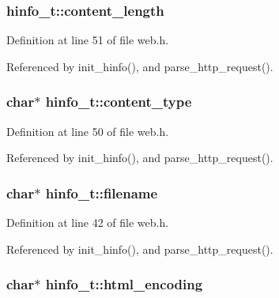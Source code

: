 \subsubsection[{\texorpdfstring{content\+\_\+length}{content_length}}]{ hinfo\+\_\+t\+::content\+\_\+length}\hypertarget{structhinfo__t_a6cf5714c0fe8e8e7f7819194274f9052}{}\label{structhinfo__t_a6cf5714c0fe8e8e7f7819194274f9052}


Definition at line 51 of file web.\+h.



Referenced by init\+\_\+hinfo(), and parse\+\_\+http\+\_\+request().

\subsubsection[{\texorpdfstring{content\+\_\+type}{content_type}}]{\setlength{\rightskip}{0pt plus 5cm}char$\ast$ hinfo\+\_\+t\+::content\+\_\+type}\hypertarget{structhinfo__t_a87bad5ce6af7ed3613a61d01aef94d8d}{}\label{structhinfo__t_a87bad5ce6af7ed3613a61d01aef94d8d}


Definition at line 50 of file web.\+h.



Referenced by init\+\_\+hinfo(), and parse\+\_\+http\+\_\+request().

\subsubsection[{\texorpdfstring{filename}{filename}}]{\setlength{\rightskip}{0pt plus 5cm}char$\ast$ hinfo\+\_\+t\+::filename}\hypertarget{structhinfo__t_a874ffdf5ade4e3844d7719444495e89c}{}\label{structhinfo__t_a874ffdf5ade4e3844d7719444495e89c}


Definition at line 42 of file web.\+h.



Referenced by init\+\_\+hinfo(), and parse\+\_\+http\+\_\+request().

\subsubsection[{\texorpdfstring{html\+\_\+encoding}{html_encoding}}]{\setlength{\rightskip}{0pt plus 5cm}char$\ast$ hinfo\+\_\+t\+::html\+\_\+encoding}\hypertarget{structhinfo__t_ac03bcdde52e49a14bf9112f295f216b5}{}\label{structhinfo__t_ac03bcdde52e49a14bf9112f295f216b5}


